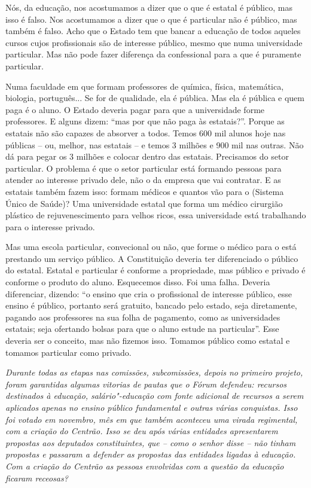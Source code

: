 Nós, da educação, nos acostumamos a dizer que o que é estatal é público,
mas isso é falso. Nos acostumamos a dizer que o que é particular não é
público, mas também é falso. Acho que o Estado tem que bancar a educação
de todos aqueles cursos cujos profissionais são de interesse público,
mesmo que numa universidade particular. Mas não pode fazer diferença da
confessional para a que é puramente particular.

Numa faculdade em que formam professores de química, física, matemática,
biologia, português... Se for de qualidade, ela é pública. Mas ela é
pública e quem paga é o aluno. O Estado deveria pagar para que a
universidade forme professores. E alguns dizem: ``mas por que não paga
às estatais?''. Porque as estatais não são capazes de absorver a todos.
Temos 600 mil alunos hoje nas públicas -- ou, melhor, nas estatais -- e
temos 3 milhões e 900 mil nas outras. Não dá para pegar os 3 milhões e
colocar dentro das estatais. Precisamos do setor particular. O problema
é que o setor particular está formando pessoas para atender ao interesse
privado dele, não o da empresa que vai contratar. E as estatais também
fazem isso: formam médicos e quantos vão para o  (Sistema Único de
Saúde)? Uma universidade estatal que forma um médico cirurgião plástico
de rejuvenescimento para velhos ricos, essa universidade está
trabalhando para o interesse privado.

Mas uma escola particular, convecional ou não, que forme o médico para o
 está prestando um serviço público. A Constituição deveria ter
diferenciado o público do estatal. Estatal e particular é conforme a
propriedade, mas público e privado é conforme o produto do aluno.
Esquecemos disso. Foi uma falha. Deveria diferenciar, dizendo: ``o
ensino que cria o profissional de interesse público, esse ensino é
público, portanto será gratuito, bancado pelo estado, seja diretamente,
pagando aos professores na sua folha de pagamento, como as universidades
estatais; seja ofertando bolsas para que o aluno estude na particular''.
Esse deveria ser o conceito, mas não fizemos isso. Tomamos público como
estatal e tomamos particular como privado.

\emph{Durante todas as etapas nas comissões, subcomissões, depois no
primeiro projeto, foram garantidas algumas vitorias de pautas que o
Fórum defendeu: recursos destinados à educação, salário"-educação com
fonte adicional de recursos a serem aplicados apenas no ensino público
fundamental e outras várias conquistas. Isso foi votado em novembro, mês
em que também aconteceu uma virada regimental, com a criação do Centrão.
Isso se deu após várias entidades apresentarem propostas aos deputados
constituintes, que -- como o senhor disse -- não tinham propostas e
passaram a defender as propostas das entidades ligadas à educação. Com a
criação do Centrão as pessoas envolvidas com a questão da educação
ficaram receosas?}

